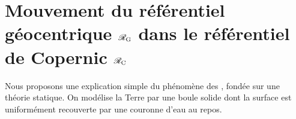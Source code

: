 \documentclass[12pt,fancy]{cours}
\begin{document}






\section{Mouvement du référentiel géocentrique $\mathcal{R}_{\rm{G}}$ dans le référentiel de Copernic $\mathcal{R}_{\rm{C}}$}
 \label{sec:étude_marées}
  Nous proposons une explication simple du phénomène des , fondée sur une théorie statique. On modélise la Terre par une boule solide dont la surface est uniformément recouverte par une couronne d'eau au repos. %
\end{document}
